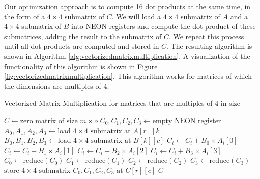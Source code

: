 \documentclass[11pt,a4paper]{report}
\theoremstyle{definition}
\begin{document}
Our optimization approach is to compute 16 dot products at the same time, in the form of a $4\times4$ submatrix of $C$. We will load a $4\times4$ submatrix of $A$ and a $4\times4$ submatrix of $B$ into NEON registers and compute the dot product of these submatrices, adding the result to the submatrix of $C$. We repeat this process until all dot products are computed and stored in $C$. The resulting algorithm is shown in Algorithm \ref{alg:vectorizedmatrixmultiplication}. A visualization of the functionality of this algorithm is shown in Figure \ref{fig:vectorizedmatrixmultiplication}. This algorithm works for matrices of which the dimensions are multiples of 4.

\begin{algorithm}
  \caption{Vectorized Matrix Multiplication for matrices that are multiples of 4 in size}
  \label{alg:vectorizedmatrixmultiplication}
  \begin{algorithmic}
      \State $C \gets \text{zero matrix of size } m \times o$
          \State $C_0, C_1, C_2, C_3 \gets \text{empty NEON register}$
            \State $A_0, A_1, A_2, A_3 \gets \text{load } 4\times4 \text{ submatrix at } A[r][k]$
            \State $B_0, B_1, B_2, B_3 \gets \text{load } 4\times4 \text{ submatrix at } B[k][c]$
              \State $C_i \gets C_i + B_0 \times A_i[0]$
              \State $C_i \gets C_i + B_1 \times A_i[1]$
              \State $C_i \gets C_i + B_2 \times A_i[2]$
              \State $C_i \gets C_i + B_3 \times A_i[3]$
            \EndFor
          \EndFor
          \State $C_0 \gets \text{reduce}(C_0)$
          \State $C_1 \gets \text{reduce}(C_1)$
          \State $C_2 \gets \text{reduce}(C_2)$
          \State $C_3 \gets \text{reduce}(C_3)$
          \State $\text{store } 4\times4 \text{ submatrix } C_0, C_1, C_2, C_3 \text{ at } C[r][c]$
        \EndFor
      \EndFor
      \State \Return $C$
    \EndFunction
  \end{algorithmic}
\end{algorithm}
\end{document}
